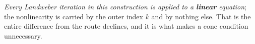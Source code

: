 \begin{definition}
\emph{Every Landweber iteration in this construction is applied to a \textbf{linear} equation}; the
nonlinearity is carried by the outer index $k$ and by nothing else. That is the entire difference from
the route  declines, and it is what makes a cone condition unnecessary.
\end{definition}




